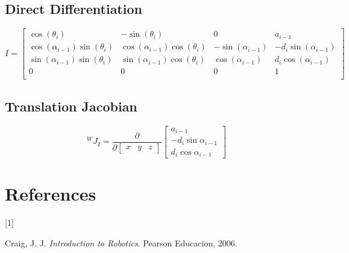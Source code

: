 \documentclass[
  letterpaper,
  DIV=11,
  numbers=noendperiod]{scrreprt}
\newlength{\cslhangindent}
\newlength{\csllabelwidth}
\newlength{\cslentryspacingunit} %
\newenvironment{CSLReferences}[2] %
 {%
  \setlength{\parindent}{0pt}
  \ifodd #1
  \let\oldpar\par
  \def\par{\hangindent=\cslhangindent\oldpar}
  \fi
  \setlength{\parskip}{#2\cslentryspacingunit}
 }%
 {}
\newcommand{\CSLLeftMargin}[1]{\parbox[t]{\csllabelwidth}{#1}}
\newcommand{\CSLRightInline}[1]{\parbox[t]{\linewidth - \csllabelwidth}{#1}\break}
\begin{document}
\hypertarget{direct-differentiation}{%
\section{Direct Differentiation}\label{direct-differentiation}}

\[ 
I = \left[
\begin{array}{cccc}
\cos\left( \theta_i \right) &  - \sin\left( \theta_i \right) & 0 & a_{i - 1} \\
\cos\left( \alpha_{i - 1} \right) \sin\left( \theta_i \right) & \cos\left( \alpha_{i - 1} \right) \cos\left( \theta_i \right) &  - \sin\left( \alpha_{i - 1} \right) &  - d_i \sin\left( \alpha_{i - 1} \right) \\
\sin\left( \alpha_{i - 1} \right) \sin\left( \theta_i \right) & \sin\left( \alpha_{i - 1} \right) \cos\left( \theta_i \right) & \cos\left( \alpha_{i - 1} \right) & d_i \cos\left( \alpha_{i - 1} \right) \\
0 & 0 & 0 & 1 \\
\end{array}
\right]
\]

\hypertarget{translation-jacobian}{%
\section{Translation Jacobian}\label{translation-jacobian}}

\[
{}^WJ_I = \frac{\partial}{\partial \begin{bmatrix} x& y & z \end{bmatrix}} \begin{bmatrix} a_{i-1} \\ -d_i \sin\alpha_{i-1} \\ d_i \cos\alpha_{i-1} \end{bmatrix}
\]


\hypertarget{references}{%
\chapter*{References}\label{references}}


\hypertarget{refs}{}
\begin{CSLReferences}{0}{0}
\leavevmode{}%
\CSLLeftMargin{{[}1{]} }%
\CSLRightInline{Craig, J. J. \emph{Introduction to Robotics}. Pearson
Educacion, 2006.}

\end{CSLReferences}
\end{document}
